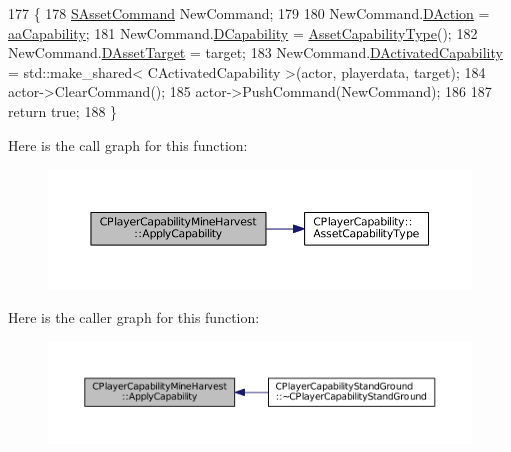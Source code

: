 \begin{DoxyCode}
177                                                                                                            
                                                               \{
178     \hyperlink{structSAssetCommand}{SAssetCommand} NewCommand;
179     
180     NewCommand.\hyperlink{structSAssetCommand_a8edd3b3d59a76d5514ba403bc8076a75}{DAction} = \hyperlink{GameDataTypes_8h_ab47668e651a3032cfb9c40ea2d60d670acf9fb164e8abd71c71f4a8c7fda360d4}{aaCapability};
181     NewCommand.\hyperlink{structSAssetCommand_a734ea7c6847457b437360f333f570ff9}{DCapability} = \hyperlink{classCPlayerCapability_a433bb196cd6ab6a932f1cac102b3aa98}{AssetCapabilityType}();
182     NewCommand.\hyperlink{structSAssetCommand_a3d9b43f6e59c386c48c41a65448a0c39}{DAssetTarget} = target;
183     NewCommand.\hyperlink{structSAssetCommand_ad8beda19520811cc70fe1eab16c774dd}{DActivatedCapability} = std::make\_shared< CActivatedCapability >(actor, 
      playerdata, target);
184     actor->ClearCommand();
185     actor->PushCommand(NewCommand);
186 
187     \textcolor{keywordflow}{return} \textcolor{keyword}{true};
188 \}
\end{DoxyCode}
Here is the call graph for this function\+:
\nopagebreak
\begin{figure}[H]
\begin{center}
\leavevmode
\includegraphics[width=350pt]{classCPlayerCapabilityMineHarvest_a76a72fe97148f5026e67aab24ab21b21_cgraph}
\end{center}
\end{figure}
Here is the caller graph for this function\+:
\nopagebreak
\begin{figure}[H]
\begin{center}
\leavevmode
\includegraphics[width=350pt]{classCPlayerCapabilityMineHarvest_a76a72fe97148f5026e67aab24ab21b21_icgraph}
\end{center}
\end{figure}
\hypertarget{classCPlayerCapabilityMineHarvest_a31da799cc9bc9be9f986bd878d13283a}{}\label{classCPlayerCapabilityMineHarvest_a31da799cc9bc9be9f986bd878d13283a} 
